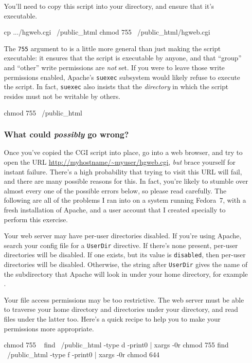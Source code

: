 You'll need to copy this script into your 
directory, and ensure that it's executable.
\begin{codesample2}
  cp .../hgweb.cgi ~/public_html
  chmod 755 ~/public_html/hgweb.cgi
\end{codesample2}
The \texttt{755} argument to  is a little more general
than just making the script executable: it ensures that the script is
executable by anyone, and that ``group'' and ``other'' write
permissions are \emph{not} set.  If you were to leave those write
permissions enabled, Apache's \texttt{suexec} subsystem would likely
refuse to execute the script.  In fact, \texttt{suexec} also insists
that the \emph{directory} in which the script resides must not be
writable by others.
\begin{codesample2}
  chmod 755 ~/public_html
\end{codesample2}

\subsubsection{What could \emph{possibly} go wrong?}
\label{sec:collab:wtf}

Once you've copied the CGI script into place, go into a web browser,
and try to open the URL \url{http://myhostname/~myuser/hgweb.cgi},
\emph{but} brace yourself for instant failure.  There's a high
probability that trying to visit this URL will fail, and there are
many possible reasons for this.  In fact, you're likely to stumble
over almost every one of the possible errors below, so please read
carefully.  The following are all of the problems I ran into on a
system running Fedora~7, with a fresh installation of Apache, and a
user account that I created specially to perform this exercise.

Your web server may have per-user directories disabled.  If you're
using Apache, search your config file for a \texttt{UserDir}
directive.  If there's none present, per-user directories will be
disabled.  If one exists, but its value is \texttt{disabled}, then
per-user directories will be disabled.  Otherwise, the string after
\texttt{UserDir} gives the name of the subdirectory that Apache will
look in under your home directory, for example .

Your file access permissions may be too restrictive.  The web server
must be able to traverse your home directory and directories under
your  directory, and read files under the latter
too.  Here's a quick recipe to help you to make your permissions more
appropriate.
\begin{codesample2}
  chmod 755 ~
  find ~/public_html -type d -print0 | xargs -0r chmod 755
  find ~/public_html -type f -print0 | xargs -0r chmod 644
\end{codesample2}

